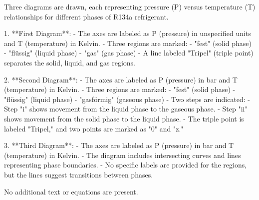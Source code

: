 Three diagrams are drawn, each representing pressure (P) versus temperature (T) relationships for different phases of R134a refrigerant.

1. **First Diagram**:  
   - The axes are labeled as P (pressure) in unspecified units and T (temperature) in Kelvin.  
   - Three regions are marked:  
     - "fest" (solid phase)  
     - "flüssig" (liquid phase)  
     - "gas" (gas phase)  
   - A line labeled "Tripel" (triple point) separates the solid, liquid, and gas regions.  

2. **Second Diagram**:  
   - The axes are labeled as P (pressure) in bar and T (temperature) in Kelvin.  
   - Three regions are marked:  
     - "fest" (solid phase)  
     - "flüssig" (liquid phase)  
     - "gasförmig" (gaseous phase)  
   - Two steps are indicated:  
     - Step "i" shows movement from the liquid phase to the gaseous phase.  
     - Step "ii" shows movement from the solid phase to the liquid phase.  
   - The triple point is labeled "Tripel," and two points are marked as "0" and "z."  

3. **Third Diagram**:  
   - The axes are labeled as P (pressure) in bar and T (temperature) in Kelvin.  
   - The diagram includes intersecting curves and lines representing phase boundaries.  
   - No specific labels are provided for the regions, but the lines suggest transitions between phases.  

No additional text or equations are present.